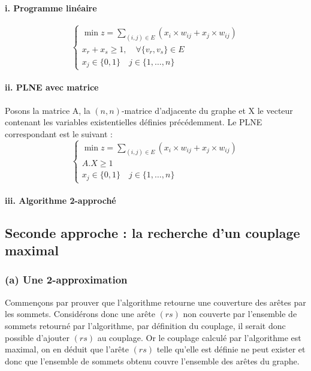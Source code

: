 \paragraph{i. Programme linéaire}
$$
\left \lbrace \begin{array}{l}
	\min z = \sum\limits_{(i,j)\in E}{(x_i \times w_{ij} + x_j \times w_{ij})}\\
	x_r + x_s \geq 1, \quad \forall \{v_r, v_s\} \in E \\
	x_j \in \{0,1\} \quad j \in \{1, \ldots, n\}
\end{array} \right .
$$

\paragraph{ii. PLNE avec matrice\\}

Posons la matrice A, la $(n,n)$-matrice d'adjacente du graphe et X le vecteur contenant les variables existentielles définies précédemment. Le PLNE correspondant est le suivant :
$$
\left \lbrace \begin{array}{l}
	\min z = \sum\limits_{(i,j)\in E}{(x_i \times w_{ij} + x_j \times w_{ij})}\\
	A.X \geq 1\\
	x_j \in \{0,1\} \quad j \in \{1, \ldots, n\}
\end{array} \right .
$$

\paragraph{iii. Algorithme 2-approché}


\subsection{Seconde approche : la recherche d'un couplage maximal}

\subsubsection{(a) Une 2-approximation}

Commençons par prouver que l'algorithme retourne une couverture des arêtes par les sommets.
Considérons donc une arête $(rs)$ non couverte par l'ensemble de sommets retourné par l'algorithme, par
définition du couplage, il serait donc possible d'ajouter $(rs)$ au couplage. Or le couplage calculé
par l'algorithme est maximal, on en déduit que l'arête $(rs)$ telle qu'elle est définie ne peut
exister et donc que l'ensemble de sommets obtenu couvre l'ensemble des arêtes du graphe.

